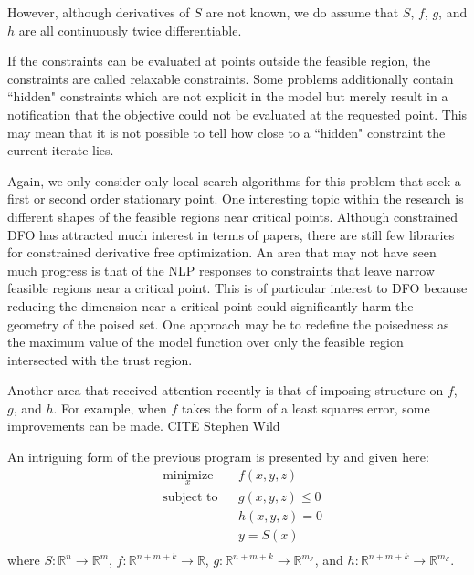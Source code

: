 \documentclass{article}
\begin{document}
However, although derivatives of $S$ are not known, we do assume that $S$, $f$, $g$, and $h$ are all continuously twice differentiable.

If the constraints can be evaluated at points outside the feasible region, the constraints are called relaxable constraints.
Some problems additionally contain ``hidden" constraints which are not explicit in the model but merely result in a notification that the objective could not be evaluated at the requested point.
This may mean that it is not possible to tell how close to a ``hidden" constraint the current iterate lies.

Again, we only consider only local search algorithms for this problem that seek a first or second order stationary point.
One interesting topic within the research is different shapes of the feasible regions near critical points.
Although constrained DFO has attracted much interest in terms of papers, there are still few libraries for constrained derivative free optimization.
An area that may not have seen much progress is that of the NLP responses to constraints that leave narrow feasible regions near a critical point.
This is of particular interest to DFO because reducing the dimension near a critical point could significantly harm the geometry of the poised set.
One approach may be to redefine the poisedness as the maximum value of the model function over only the feasible region intersected with the trust region.

Another area that received attention recently is that of imposing structure on $f$, $g$, and $h$.
For example, when $f$ takes the form of a least squares error, some improvements can be made. CITE Stephen Wild


An intriguing form of the previous program is presented by \cite{DUMMY:Biegler} and given here:
\begin{equation*}
\begin{aligned}
& \underset{x}{\text{minimize}} & & f(x, y, z) \\
& \text{subject to} & & g(x, y, z) \leq 0 \\
& & & h(x, y, z) = 0 \\
& & & y = S(x) \;  \\
\end{aligned}
\end{equation*}
where
$S : \mathbb{R}^n \to \mathbb{R}^m$,
$f : \mathbb{R}^{n+m+k} \to \mathbb{R}$,
$g : \mathbb{R}^{n+m+k} \to \mathbb{R}^{m_{\mathcal{I}}}$, and
$h : \mathbb{R}^{n+m+k} \to \mathbb{R}^{m_{\mathcal{E}}}$.
\end{document}
